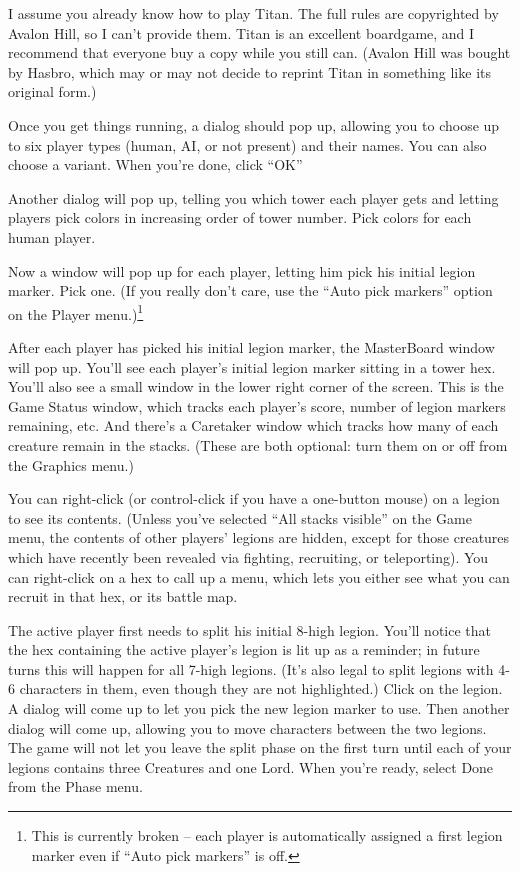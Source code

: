 \documentclass{article}
\begin{document}
I assume you already know how to play Titan. The full rules are copyrighted by 
Avalon Hill, so I can't provide them. Titan is an excellent boardgame, and I 
recommend that everyone buy a copy while you still can. (Avalon Hill was bought 
by Hasbro, which may or may not decide to reprint Titan in something like its 
original form.)

Once you get things running, a dialog should pop up, allowing you to choose up 
to six player types (human, AI, or not present) and their names.  You can also 
choose a variant.  When you're done, click ``OK'' 

Another dialog will pop up, telling you which tower each player gets and 
letting players pick colors in increasing order of tower number. Pick colors 
for each human player.

Now a window will pop up for each player, letting him pick his initial legion
marker. Pick one. (If you really don't care, use the ``Auto pick markers''
option on the Player menu.)\footnote{This is currently broken -- each player
is automatically assigned a first legion marker even if ``Auto pick markers''
is off.}

After each player has picked his initial legion marker, the MasterBoard window
will pop up. You'll see each player's initial legion marker sitting in a tower 
hex. You'll also see a small window in the lower right corner of the screen. 
This is the Game Status window, which tracks each player's score, number of 
legion markers remaining, etc. And there's a Caretaker window which tracks how 
many of each creature remain in the stacks. (These are both optional: turn them
on or off from the Graphics menu.)

You can right-click (or control-click if you have a one-button mouse) on a 
legion to see its contents. (Unless you've selected ``All stacks visible'' on
the Game menu, the contents of other players' legions are hidden, except for 
those creatures which have recently been revealed via fighting, recruiting, or
teleporting). You can right-click on a hex to call up a menu, which lets you 
either see what you can recruit in that hex, or its battle map.

The active player first needs to split his initial 8-high legion. You'll
notice that the hex containing the active player's legion is lit up as a
reminder; in future turns this will happen for all 7-high legions. (It's
also legal to split legions with 4-6 characters in them, even though they
are not highlighted.) Click on the legion. A dialog will come up to let
you pick the new legion marker to use. Then another dialog will come up,
allowing you to move characters between the two legions. The game will
not let you leave the split phase on the first turn until each of your
legions contains three Creatures and one Lord. When you're ready, select
Done from the Phase menu.
\end{document}

